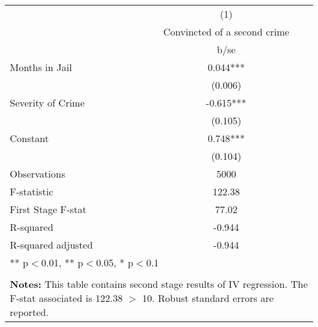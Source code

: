 \begin{tabular}{l*{1}{c}}
\hline\hline
                    &\multicolumn{1}{c}{(1)}\\
                    &\multicolumn{1}{c}{Convincted of a second crime}\\
                    &        b/se         \\
\hline
Months in Jail      &       0.044***\\
                    &     (0.006)         \\
Severity of Crime   &      -0.615***\\
                    &     (0.105)         \\
Constant            &       0.748***\\
                    &     (0.104)         \\
\hline
Observations        &        5000         \\
F-statistic         &      122.38         \\
First Stage F-stat  &       77.02         \\
R-squared           &      -0.944         \\
R-squared adjusted                &      -0.944         \\
\hline\hline
\multicolumn{2}{p{0.6\linewidth}}{\small *** p$<$0.01, ** p$<$0.05, * p$<$0.1} \\
\\
\multicolumn{2}{p{0.6\linewidth}}{\small \textbf{Notes:} This table contains second stage results of IV regression. The F-stat associated is 122.38 $>$ 10. Robust standard errors are reported.} \\
\end{tabular}

